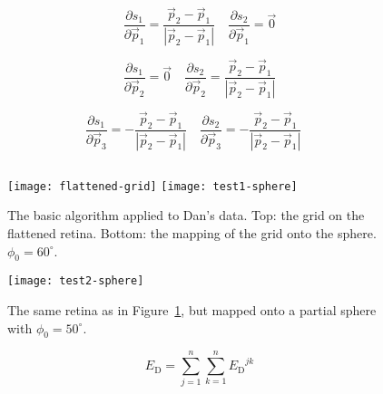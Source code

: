 \documentclass{article}
\newcommand{\ED}{\ensuremath{E_\mathrm{D}}\xspace}
\newcommand{\p}{\vec{p}}
\begin{document}
\begin{equation}
  \frac{\partial s_1}{\partial \p_1} = 
  \frac{\p_2 - \p_1}{|\p_2 - \p_1|} \quad
  \frac{\partial s_2}{\partial \p_1} = \vec{0}
\end{equation}

\begin{equation}
  \frac{\partial s_1}{\partial \p_2} = \vec{0} \quad
  \frac{\partial s_2}{\partial \p_2} =   \frac{\p_2 - \p_1}{|\p_2 - \p_1|} 
\end{equation}

\begin{equation}
  \frac{\partial s_1}{\partial \p_3} = 
  -\frac{\p_2 - \p_1}{|\p_2 - \p_1|} \quad
  \frac{\partial s_2}{\partial \p_3} = 
  -\frac{\p_2 - \p_1}{|\p_2 - \p_1|} \quad
\end{equation}




\begin{equation}
  \label{fold-sphere:eq:13}
\end{equation}



\begin{figure}
  \centering
  \texttt{[image: flattened-grid]}
  \texttt{[image: test1-sphere]}
  \caption{The basic algorithm applied to Dan's data. Top: the grid on
    the flattened retina. Bottom: the mapping of the grid onto the
    sphere. $\phi_0= 60^\circ$.}
  \label{fold-sphere:fig:test1}
\end{figure}

\begin{figure}
  \centering
  \texttt{[image: test2-sphere]}
  \caption{The same retina as in Figure~\ref{fold-sphere:fig:test1},
    but mapped onto a partial sphere with $\phi_0= 50^\circ$.}
  \label{fold-sphere:fig:test2}
\end{figure}

\begin{equation}
  \ED = \sum_{j=1}^n \sum_{k=1}^n \ED^{jk}
\end{equation}
\end{document}
